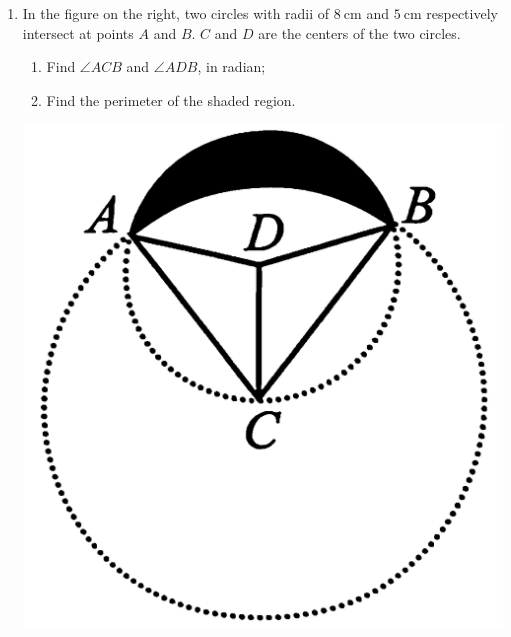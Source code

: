 \documentclass{report}
\begin{document}
\begin{enumerate}
	\item \begin{multicols}{2}
	      In the figure on the right, two circles with radii of $8 \mathrm{~cm}$ and $5 \mathrm{~cm}$ respectively intersect at points $A$ and $B$. $C$ and $D$ are the centers of the two circles.
	      \begin{enumerate}
	      	\item Find $\angle ACB$ and $\angle ADB$, in radian;
	      	\item Find the perimeter of the shaded region.
	      \end{enumerate}
	      \vfill\null
	      
	      \begin{center}
	      	\includegraphics[scale=0.1]{assets/8-33.png}
	      \end{center}
	\end{multicols}
	

\end{enumerate}
\end{document}
